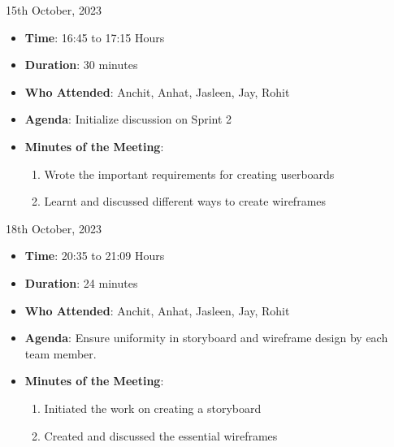 \vspace{0.5cm}

\begin{myhbox}{15th October, 2023}
    \begin{itemize}
        \item \textbf{Time}: 16:45 to 17:15 Hours
        \item \textbf{Duration}: 30 minutes
        \item \textbf{Who Attended}: Anchit, Anhat, Jasleen, Jay, Rohit
        \item \textbf{Agenda}: Initialize discussion on Sprint 2
        \vspace{0.5cm}
        \item \textbf{Minutes of the Meeting}:
            \begin{enumerate}
                \item Wrote the important requirements for creating userboards
                \item Learnt and discussed different ways to create wireframes
            \end{enumerate}
    \end{itemize}
\end{myhbox}

\vspace{0.5cm}

\begin{myhbox}{18th October, 2023}
    \begin{itemize}
        \item \textbf{Time}: 20:35 to 21:09 Hours
        \item \textbf{Duration}: 24 minutes
        \item \textbf{Who Attended}: Anchit, Anhat, Jasleen, Jay, Rohit
        \item \textbf{Agenda}: Ensure uniformity in storyboard and wireframe design by each team member.
        \vspace{0.5cm}
        \item \textbf{Minutes of the Meeting}:
            \begin{enumerate}
                \item Initiated the work on creating a storyboard
                \item Created and discussed the essential wireframes
            \end{enumerate}
    \end{itemize}
\end{myhbox}

